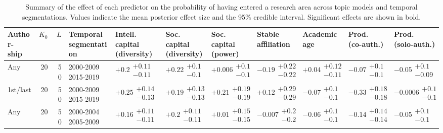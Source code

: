 \begin{table}[H]
\caption{Summary of the effect of each predictor on the probability of having entered a research area across topic models and temporal segmentations. Values indicate the mean posterior effect size and the 95\% credible interval. Significant effects are shown in bold.}
\label{table:full_summary_entered}
\renewcommand{\arraystretch}{2}\fontsize{6}{7}\selectfont\begin{tabular}{lrrllllllll}
\toprule
\makecell{Author-\\ ship} & $K_0$ & $L$ & \makecell{Temporal \\ segmentation} & \makecell{Intell. capital \\ (diversity)} & \makecell{Soc. capital \\ (diversity)} & \makecell{Soc. capital \\ (power)} & \makecell{Stable \\ affiliation} & \makecell{Academic \\ age} & \makecell{Prod. \\ (co-auth.)} & \makecell{Prod. \\ (solo-auth.)} \\
\midrule
Any & 20 & 50 & \makecell{2000-2009 \\ 2015-2019} & $\bm{+0.2}\substack{+0.11 \\ -0.11}$ & $\bm{+0.22}\substack{+0.1 \\ -0.1}$ & $+0.006\substack{+0.1 \\ -0.1}$ & $-0.19\substack{+0.22 \\ -0.22}$ & $+0.04\substack{+0.12 \\ -0.11}$ & $-0.07\substack{+0.1 \\ -0.1}$ & $-0.05\substack{+0.1 \\ -0.09}$ \\
1st/last & 20 & 50 & \makecell{2000-2009 \\ 2015-2019} & $\bm{+0.25}\substack{+0.14 \\ -0.13}$ & $\bm{+0.19}\substack{+0.13 \\ -0.13}$ & $\bm{+0.21}\substack{+0.19 \\ -0.19}$ & $+0.12\substack{+0.29 \\ -0.29}$ & $-0.07\substack{+0.1 \\ -0.1}$ & $\bm{-0.33}\substack{+0.18 \\ -0.18}$ & $-0.0006\substack{+0.1 \\ -0.1}$ \\
Any & 20 & 50 & \makecell{2000-2004 \\ 2005-2009} & $\bm{+0.16}\substack{+0.11 \\ -0.11}$ & $\bm{+0.2}\substack{+0.11 \\ -0.11}$ & $+0.01\substack{+0.15 \\ -0.15}$ & $-0.007\substack{+0.2 \\ -0.2}$ & $-0.06\substack{+0.1 \\ -0.1}$ & $\bm{-0.14}\substack{+0.14 \\ -0.14}$ & $-0.05\substack{+0.1 \\ -0.1}$ \\

\end{tabular}
\end{table}
